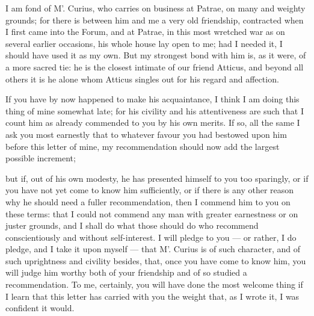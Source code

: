 

 I am fond of M'. Curius, who carries on business at Patrae, on many and weighty grounds; for there is between him and me a very old friendship, contracted when I first came into the Forum, and at Patrae, in this most wretched war as on several earlier occasions, his whole house lay open to me; had I needed it, I should have used it as my own. But my strongest bond with him is, as it were, of a more sacred tie: he is the closest intimate of our friend Atticus, and beyond all others it is he alone whom Atticus singles out for his regard and affection.

 If you have by now happened to make his acquaintance, I think I am doing this thing of mine somewhat late; for his civility and his attentiveness are such that I count him as already commended to you by his own merits. If so, all the same I ask you most earnestly that to whatever favour you had bestowed upon him before this letter of mine, my recommendation should now add the largest possible increment;

 but if, out of his own modesty, he has presented himself to you too sparingly, or if you have not yet come to know him sufficiently, or if there is any other reason why he should need a fuller recommendation, then I commend him to you on these terms: that I could not commend any man with greater earnestness or on juster grounds, and I shall do what those should do who recommend conscientiously and without self-interest. I will pledge to you --- or rather, I do pledge, and I take it upon myself --- that M'. Curius is of such character, and of such uprightness and civility besides, that, once you have come to know him, you will judge him worthy both of your friendship and of so studied a recommendation. To me, certainly, you will have done the most welcome thing if I learn that this letter has carried with you the weight that, as I wrote it, I was confident it would.
